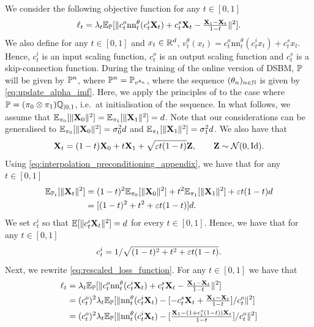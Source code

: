 \documentclass{article}
\begin{document}
We consider the following objective function for any $t  \in [0,1]$
\begin{equation}
\label{eq:rescaled_loss_function}
    \ell_t = \lambda_t \mathbb{E}_{\Pbb}[\| c_t^o \mathrm{nn}_t^\theta(c_t^i \bfX_t) + c_t^s \bfX_t - \tfrac{\bfX_1 - \bfX_t}{1-t} \|^2] . 
\end{equation}
We also define for any $t \in [0,1]$ and $x_t \in \mathbb{R}^d$, $v_t^\theta(x_t) = c_t^o \mathrm{nn}_t^\theta(c_t^i x_t) + c_t^s x_t$. Hence, $c_t^i$ is an input scaling function, $c_t^o$ is an output scaling function and $c_t^s$ is a skip-connection function. 
During the training of the online version of DSBM, $\mathbb{P}$ will be given by $\mathbb{P}^n$, where $\mathbb{P}^n = \mathbb{P}_{v^{\theta_n}}$, where the sequence $(\theta_n)_{n \in \mathbb{N}}$ is given by \eqref{eq:update_alpha_imf}. Here, we apply the principles of \cite{karras2022elucidating} to the case where $\mathbb{P} = (\pi_0 \otimes \pi_1) \mathbb{Q}_{|0,1}$, i.e.~at initialisation of the sequence. In what follows, we assume that $\mathbb{E}_{\pi_0}[\| \mathbf{X}_0 \|^2] = \mathbb{E}_{\pi_1}[\| \mathbf{X}_1 \|^2] = d$. Note that our considerations can be generalised to $\mathbb{E}_{\pi_0}[\| \mathbf{X}_0 \|^2] = \sigma_0^2 d$ and $\mathbb{E}_{\pi_1}[\| \mathbf{X}_1 \|^2] = \sigma_1^2 d$. We also have that 
\begin{equation}
\label{eq:interpolation_preconditioning_appendix}
    \bfX_t = (1-t) \bfX_0 + t \bfX_1 + \sqrt{\vareps t (1-t)} \bfZ , \qquad \bfZ \sim \gN(0, \Id) . 
\end{equation}
Using \eqref{eq:interpolation_preconditioning_appendix}, we have that for any $t \in [0,1]$
\begin{align}
    \mathbb{E}_{\mathbb{P}_t}[\| \mathbf{X}_t \|^2] &= (1-t)^2 \mathbb{E}_{\pi_0}[\| \mathbf{X}_0 \|^2] + t^2 \mathbb{E}_{\pi_1}[\| \mathbf{X}_1 \|^2] + \varepsilon t (1-t) d \\
    &= [(1-t)^2 + t^2 + \varepsilon t (1-t)] d . 
\end{align}
We set $c_t^i$ so that $\mathbb{E}[\| c_t^i \mathbf{X}_t \|^2] = d$ for every $t \in [0,1]$. Hence, we have that for any $t \in [0,1]$
\begin{equation}
    c_t^i = 1 / \sqrt{(1-t)^2 + t^2 + \varepsilon t (1-t)} . 
\end{equation}
Next, we rewrite \eqref{eq:rescaled_loss_function}. For any $t \in [0,1]$ we have that 
\begin{align}
    \ell_t &= \lambda_t \mathbb{E}_{\mathbb{P}}[\| c_t^o \mathrm{nn}_t^\theta(c_t^i \mathbf{X}_t) + c_t^s \mathbf{X}_t - \tfrac{\mathbf{X}_1 - \mathbf{X}_t}{1-t} \|^2] \\
    &= (c_t^o)^2 \lambda_t \mathbb{E}_{\mathbb{P}}[\| \mathrm{nn}_t^\theta(c_t^i \mathbf{X}_t) - [-c_t^s \mathbf{X}_t + \tfrac{\mathbf{X}_1 - \mathbf{X}_t}{1-t}]/c_t^o \|^2] \\
    &= (c_t^o)^2 \lambda_t \mathbb{E}_{\mathbb{P}}[\| \mathrm{nn}_t^\theta(c_t^i \mathbf{X}_t) - [\tfrac{\mathbf{X}_1 - (1 + c_t^s(1-t))\mathbf{X}_t}{1-t}]/c_t^o \|^2]
\end{align}
\end{document}
